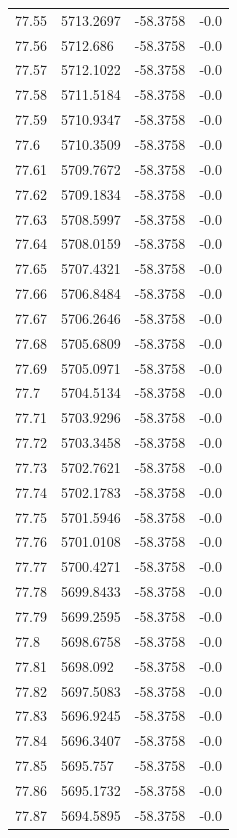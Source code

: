 \begin{table}[H]
\begin{tabular}{llll}
77.55 & 5713.2697 & -58.3758 & -0.0 \\
77.56 & 5712.686 & -58.3758 & -0.0 \\
77.57 & 5712.1022 & -58.3758 & -0.0 \\
77.58 & 5711.5184 & -58.3758 & -0.0 \\
77.59 & 5710.9347 & -58.3758 & -0.0 \\
77.6 & 5710.3509 & -58.3758 & -0.0 \\
77.61 & 5709.7672 & -58.3758 & -0.0 \\
77.62 & 5709.1834 & -58.3758 & -0.0 \\
77.63 & 5708.5997 & -58.3758 & -0.0 \\
77.64 & 5708.0159 & -58.3758 & -0.0 \\
77.65 & 5707.4321 & -58.3758 & -0.0 \\
77.66 & 5706.8484 & -58.3758 & -0.0 \\
77.67 & 5706.2646 & -58.3758 & -0.0 \\
77.68 & 5705.6809 & -58.3758 & -0.0 \\
77.69 & 5705.0971 & -58.3758 & -0.0 \\
77.7 & 5704.5134 & -58.3758 & -0.0 \\
77.71 & 5703.9296 & -58.3758 & -0.0 \\
77.72 & 5703.3458 & -58.3758 & -0.0 \\
77.73 & 5702.7621 & -58.3758 & -0.0 \\
77.74 & 5702.1783 & -58.3758 & -0.0 \\
77.75 & 5701.5946 & -58.3758 & -0.0 \\
77.76 & 5701.0108 & -58.3758 & -0.0 \\
77.77 & 5700.4271 & -58.3758 & -0.0 \\
77.78 & 5699.8433 & -58.3758 & -0.0 \\
77.79 & 5699.2595 & -58.3758 & -0.0 \\
77.8 & 5698.6758 & -58.3758 & -0.0 \\
77.81 & 5698.092 & -58.3758 & -0.0 \\
77.82 & 5697.5083 & -58.3758 & -0.0 \\
77.83 & 5696.9245 & -58.3758 & -0.0 \\
77.84 & 5696.3407 & -58.3758 & -0.0 \\
77.85 & 5695.757 & -58.3758 & -0.0 \\
77.86 & 5695.1732 & -58.3758 & -0.0 \\
77.87 & 5694.5895 & -58.3758 & -0.0 \\

\end{tabular}
\end{table}
